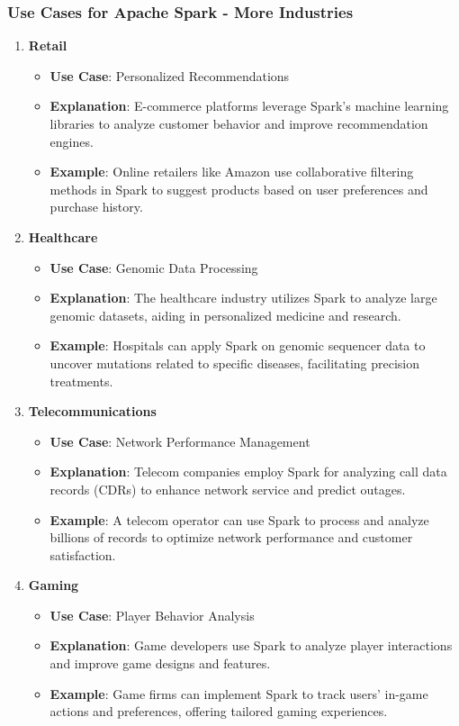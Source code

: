 \documentclass[aspectratio=169]{beamer}
\begin{document}
\begin{frame}[fragile]
    \frametitle{Use Cases for Apache Spark - More Industries}
    \begin{enumerate}
        \item \textbf{Retail}
        \begin{itemize}
            \item \textbf{Use Case}: Personalized Recommendations
            \item \textbf{Explanation}: E-commerce platforms leverage Spark's machine learning libraries to analyze customer behavior and improve recommendation engines.
            \item \textbf{Example}: Online retailers like Amazon use collaborative filtering methods in Spark to suggest products based on user preferences and purchase history.
        \end{itemize}

        \item \textbf{Healthcare}
        \begin{itemize}
            \item \textbf{Use Case}: Genomic Data Processing
            \item \textbf{Explanation}: The healthcare industry utilizes Spark to analyze large genomic datasets, aiding in personalized medicine and research.
            \item \textbf{Example}: Hospitals can apply Spark on genomic sequencer data to uncover mutations related to specific diseases, facilitating precision treatments.
        \end{itemize}

        \item \textbf{Telecommunications}
        \begin{itemize}
            \item \textbf{Use Case}: Network Performance Management
            \item \textbf{Explanation}: Telecom companies employ Spark for analyzing call data records (CDRs) to enhance network service and predict outages.
            \item \textbf{Example}: A telecom operator can use Spark to process and analyze billions of records to optimize network performance and customer satisfaction.
        \end{itemize}
        
        \item \textbf{Gaming}
        \begin{itemize}
            \item \textbf{Use Case}: Player Behavior Analysis
            \item \textbf{Explanation}: Game developers use Spark to analyze player interactions and improve game designs and features.
            \item \textbf{Example}: Game firms can implement Spark to track users’ in-game actions and preferences, offering tailored gaming experiences.
        \end{itemize}
    \end{enumerate}
\end{frame}
\end{document}
